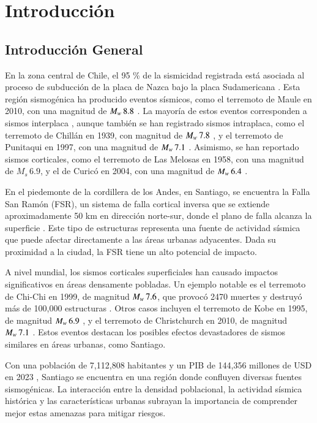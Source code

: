 \chapter{Introducción}
\section{Introducción General}

En la zona central de Chile, el 95 \% de la sismicidad registrada está asociada al proceso de subducción de la placa de Nazca bajo la placa Sudamericana . Esta región sismogénica ha producido eventos sísmicos, como el terremoto de Maule en 2010, con una magnitud de \(M_w{}\,8.8\) . La mayoría de estos eventos corresponden a sismos interplaca , aunque también se han registrado sismos intraplaca, como el terremoto de Chillán en 1939, con magnitud de \(M_w{}\,7.8\) , y el terremoto de Punitaqui en 1997, con una magnitud de \(M_w{}\,7.1\) . Asimismo, se han reportado sismos corticales, como el terremoto de Las Melosas en 1958, con una magnitud de \(M_s\,6.9\), y el de Curicó en 2004, con una magnitud de \(M_w{}\,6.4\) .

En el piedemonte de la cordillera de los Andes, en Santiago, se encuentra la Falla San Ramón (FSR), un sistema de falla cortical inversa que se extiende aproximadamente 50 km en dirección norte-sur, donde el plano de falla alcanza la superficie . Este tipo de estructuras representa una fuente de actividad sísmica que puede afectar directamente a las áreas urbanas adyacentes. Dada su proximidad a la ciudad, la FSR tiene un alto potencial de impacto.

A nivel mundial, los sismos corticales superficiales han causado impactos significativos en áreas densamente pobladas. Un ejemplo notable es el terremoto de Chi-Chi en 1999, de magnitud \(M_w{}\,7.6\), que provocó 2470 muertes y destruyó más de 100,000 estructuras . Otros casos incluyen el terremoto de Kobe en 1995, de magnitud \(M_w{}\,6.9\) , y el terremoto de Christchurch en 2010, de magnitud \(M_w{}\,7.1\) . Estos eventos destacan los posibles efectos devastadores de sismos similares en áreas urbanas, como Santiago.

Con una población de 7,112,808 habitantes  y un PIB de 144,356 millones de USD en 2023 , Santiago se encuentra en una región donde confluyen diversas fuentes sismogénicas. La interacción entre la densidad poblacional, la actividad sísmica histórica y las características urbanas subrayan la importancia de comprender mejor estas amenazas para mitigar riesgos.

